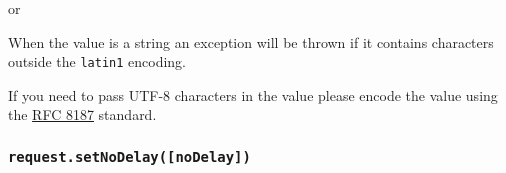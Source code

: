 \begin{Shaded}
\begin{Highlighting}[]
\NormalTok{(}\OperatorTok{,} \NormalTok{)}\OperatorTok{;}
\end{Highlighting}
\end{Shaded}

or

\begin{Shaded}
\begin{Highlighting}[]
\NormalTok{(}\OperatorTok{,}\NormalTok{ [}\OperatorTok{,} \NormalTok{])}\OperatorTok{;}
\end{Highlighting}
\end{Shaded}

When the value is a string an exception will be thrown if it contains
characters outside the \texttt{latin1} encoding.

If you need to pass UTF-8 characters in the value please encode the
value using the \href{https://www.rfc-editor.org/rfc/rfc8187.txt}{RFC
8187} standard.

\begin{Shaded}
\begin{Highlighting}[]
\OperatorTok{=} \OperatorTok{;}
\NormalTok{(}\OperatorTok{,} \SpecialCharTok{$\{}\SpecialCharTok{\}}\VerbatimStringTok{\textasciigrave{}}\NormalTok{)}\OperatorTok{;}
\end{Highlighting}
\end{Shaded}

\subsubsection{\texorpdfstring{\texttt{request.setNoDelay({[}noDelay{]})}}{request.setNoDelay({[}noDelay{]})}}\label{request.setnodelaynodelay}

